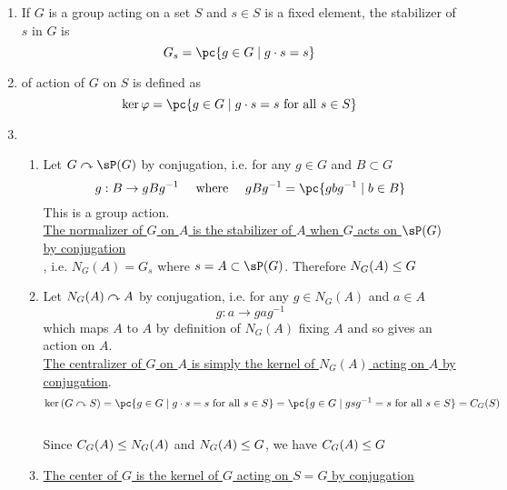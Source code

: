 \documentclass[11pt]{article}
\begin{document}
\begin{definition*}
    \begin{enumerate}
        \item {} If $G$ is a group acting on a set $S$ and $s\in S$ is a fixed element, the stabilizer of $s$ in $G$ is 
        \[
            G_s = \pc{g\in G \mid g\cdot s = s}    
        \]
        \item {} of action of $G$ on $S$ is defined as 
        \[
            \ker{\varphi} = \pc{
                g\in G \mid g\cdot s = s \text{ for all } s\in S
            }
        \]
        \item {}
        \begin{enumerate}
            \item {} Let $G\actson \sP(G)$ by conjugation, i.e. for any $g\in G$ and $B\subset G$
            \[
                g: B \to gBg^{-1} 
                \quad \text{ where } \quad
                gBg^{-1} = \pc{gbg^{-1} \mid b\in B}
            \]
            This is a group action. \\ 
            \underline{The normalizer of $G$ on $A$ is the stabilizer of $A$ when $G$ acts on $\sP(G)$ by conjugation} \\
            , i.e. $N_G(A) = G_s$ where $s=A\subset \sP(G)$. Therefore $N_G(A) \leq G$
            \item {} Let $N_G(A) \curvearrowright A$ by conjugation, i.e. for any $g\in N_G(A)$ and $a\in A$
            \[
                g: a\to gag^{-1}    
            \]
            which maps $A$ to $A$ by definition of $N_G(A)$ fixing $A$ and so gives an action on $A$. \\  \underline{The centralizer of $G$ on $A$ is simply the kernel of $N_G(A)$ acting on $A$ by conjugation}. 
            \[
                \ker{(G\actson S)} = \pc{
                    g\in G \mid g\cdot s = s \text{ for all } s\in S
                }
                = \pc{
                    g\in G \mid gsg^{-1} = s \text{ for all } s\in S
                }
                = C_G(S)
            \]
            \\ Since $C_G(A)\leq N_G(A)$ and $N_G(A)\leq G$, we have $C_G(A)\leq G$
            \item {} \underline{The center of $G$ is the kernel of $G$ acting on $S=G$ by conjugation}
        \end{enumerate} 

\end{enumerate}
\end{definition*}
\end{document}
